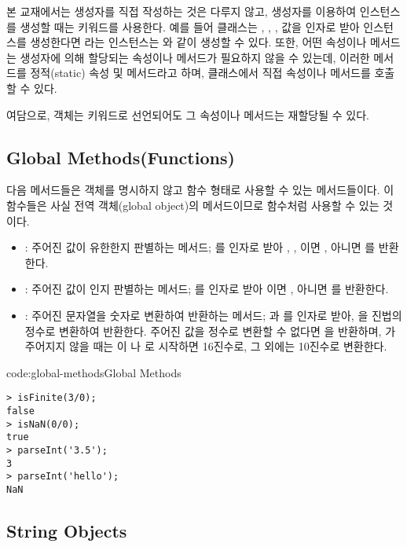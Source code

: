 본 교재에서는 생성자를 직접 작성하는 것은 다루지 않고, 생성자를 이용하여 인스턴스를 생성할 때는  키워드를 사용한다. 예를 들어  클래스는 , , ,  값을 인자로 받아 인스턴스를 생성한다면 라는 인스턴스는 와 같이 생성할 수 있다. 또한, 어떤 속성이나 메서드는 생성자에 의해 할당되는 속성이나 메서드가 필요하지 않을 수 있는데, 이러한 메서드를 정적(static) 속성 및 메서드라고 하며, 클래스에서 직접 속성이나 메서드를 호출할 수 있다.

여담으로, 객체는  키워드로 선언되어도 그 속성이나 메서드는 재할당될 수 있다.

\subsection*{Global Methods(Functions)}

다음 메서드들은 객체를 명시하지 않고 함수 형태로 사용할 수 있는 메서드들이다. 이 함수들은 사실 전역 객체(global object)의 메서드이므로 함수처럼 사용할 수 있는 것이다.

\begin{itemize}
    \item {}: 주어진 값이 유한한지 판별하는 메서드; 를 인자로 받아 , , 이면 , 아니면 를 반환한다.
    \item {}: 주어진 값이 인지 판별하는 메서드; 를 인자로 받아 이면 , 아니면 를 반환한다.
    \item {}: 주어진 문자열을 숫자로 변환하여 반환하는 메서드; 과 를 인자로 받아, 을 진법의 정수로 변환하여 반환한다. 주어진 값을 정수로 변환할 수 없다면 을 반환하며, 가 주어지지 않을 때는 이 나 로 시작하면 16진수로, 그 외에는 10진수로 변환한다.
\end{itemize}

\begin{codeenv}{code:global-methods}{Global Methods}\begin{verbatim}
> isFinite(3/0);
false
> isNaN(0/0);
true
> parseInt('3.5');
3
> parseInt('hello');
NaN
\end{verbatim}
\end{codeenv}

\subsection*{String Objects}

